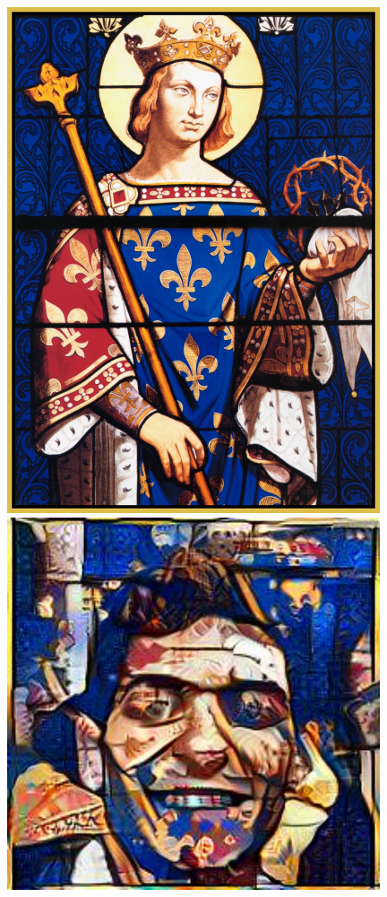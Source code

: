 \documentclass{article}
\begin{document}
\begin{figure}[!htb]
\begin{minipage}{0.25\textwidth}
\end{minipage}%
\begin{minipage}{0.25\textwidth}
\centering
\includegraphics[width=0.98\textwidth]{../Images/vitraille.jpg}
\end{minipage}%
\begin{minipage}{0.25\textwidth}
\centering
\includegraphics[width=0.98\textwidth]{../Images/transfer/tdf_vitraille.jpg}

\end{minipage}
\end{figure}
\end{document}
